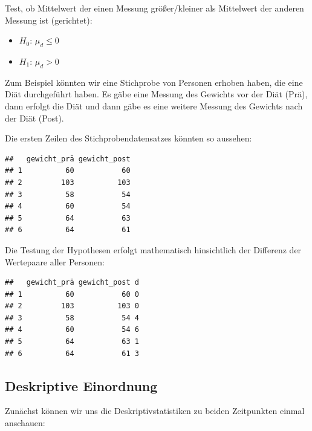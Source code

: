 \documentclass[
]{book}
\newenvironment{Shaded}{\begin{snugshade}}{\end{snugshade}}
\newcommand{\FunctionTok}[1]{\textcolor[rgb]{0.00,0.00,0.00}{#1}}
\newcommand{\NormalTok}[1]{#1}
\newcommand{\OtherTok}[1]{\textcolor[rgb]{0.56,0.35,0.01}{#1}}
\newcommand{\SpecialCharTok}[1]{\textcolor[rgb]{0.00,0.00,0.00}{#1}}
\providecommand{\tightlist}{%
  \setlength{\itemsep}{0pt}\setlength{\parskip}{0pt}}
\begin{document}
Test, ob Mittelwert der einen Messung größer/kleiner als Mittelwert der anderen Messung ist (gerichtet):

\begin{itemize}
\tightlist
\item
  \(H_0\): \(μ_d \leq 0\)
\item
  \(H_1\): \(μ_d > 0\)
\end{itemize}

Zum Beispiel könnten wir eine Stichprobe von Personen erhoben haben, die eine Diät durchgeführt haben. Es gäbe eine Messung des Gewichts vor der Diät (Prä), dann erfolgt die Diät und dann gäbe es eine weitere Messung des Gewichts nach der Diät (Post).

Die ersten Zeilen des Stichprobendatensatzes könnten so aussehen:

\begin{verbatim}
##   gewicht_prä gewicht_post
## 1          60           60
## 2         103          103
## 3          58           54
## 4          60           54
## 5          64           63
## 6          64           61
\end{verbatim}

Die Testung der Hypothesen erfolgt mathematisch hinsichtlich der Differenz der Wertepaare aller Personen:

\begin{Shaded}
\end{Shaded}

\begin{verbatim}
##   gewicht_prä gewicht_post d
## 1          60           60 0
## 2         103          103 0
## 3          58           54 4
## 4          60           54 6
## 5          64           63 1
## 6          64           61 3
\end{verbatim}

\hypertarget{deskriptive-einordnung-2}{%
\subsection{Deskriptive Einordnung}\label{deskriptive-einordnung-2}}

Zunächst können wir uns die Deskriptivstatistiken zu beiden Zeitpunkten einmal anschauen:
\end{document}
